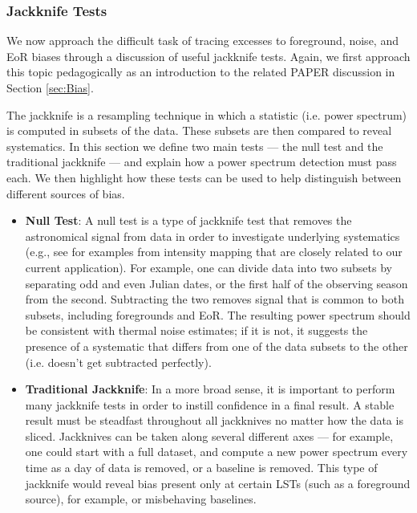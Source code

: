 \documentclass[preprint2,numberedappendix,tighten]{aastex6}  %
\begin{document}
\subsubsection{Jackknife Tests}
\label{sec:JackknifeOverview}

We now approach the difficult task of tracing excesses to foreground, noise, and EoR biases through a discussion of useful 
jackknife tests. Again, we first approach this topic pedagogically as an introduction to the related PAPER discussion in Section 
\ref{sec:Bias}. 

The jackknife is a resampling technique in which a statistic (i.e. power spectrum) is computed in subsets of the data. These 
subsets are then compared to reveal systematics. In this section we define two main tests --- the null test and the traditional 
jackknife --- and explain how a power spectrum detection must pass each. We then highlight how these tests can be used to 
help distinguish between different sources of bias.
 
\begin{itemize}
\item \textbf{Null Test}: A null test is a type of jackknife test that removes the astronomical signal from data in order to 
investigate underlying systematics (e.g., see \citet{keating_et_al2016} for examples from intensity mapping that are closely related to our current application). For example, one can 
divide data into two subsets by separating odd and even Julian dates, or the first half of the observing season from the second. 
Subtracting the two removes signal that is common to both subsets, including foregrounds and EoR. The resulting power 
spectrum should be consistent with thermal noise estimates; if it is not, it suggests the presence of a systematic that differs 
from one of the data subsets to the other (i.e. doesn't get subtracted perfectly). 
\item \textbf{Traditional Jackknife}: In a more broad sense, it is important to perform many jackknife tests in order to instill 
confidence in a final result. A stable result must be steadfast throughout all jackknives no matter how the data is sliced. 
Jackknives can be taken along several different axes --- for example, one could start with a full dataset, and compute a new 
power spectrum every time as a day of data is removed, or a baseline is removed. This type of jackknife would reveal bias 
present only at certain LSTs (such as a foreground source), for example, or misbehaving baselines.
\end{itemize}
\end{document}
